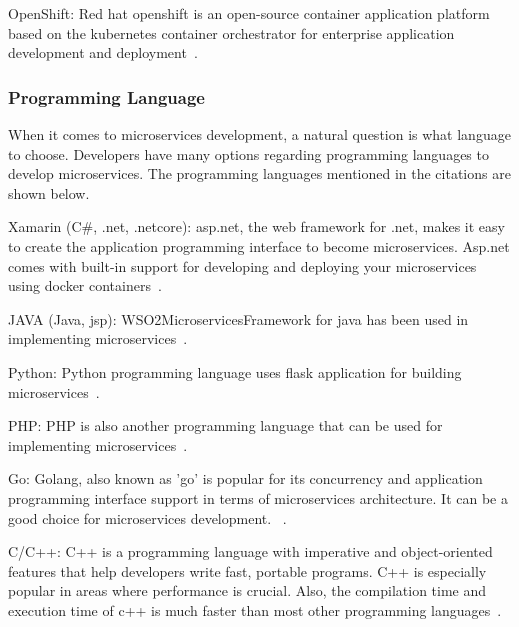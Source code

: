 \par OpenShift: Red hat openshift is an open-source container application platform based on the kubernetes container orchestrator for enterprise application development and deployment~\cite{Johansson2019, Bahadori2018}.


\subsubsection{Programming Language}
When it comes to microservices development, a natural question is what language to choose. Developers have many options regarding programming languages to develop microservices. The programming languages mentioned in the citations are shown below.

\par Xamarin (C\#, .net, .netcore): asp.net, the web framework for .net, makes it easy to create the application programming interface to become microservices. Asp.net comes with built-in support for developing and deploying your microservices using docker containers~\cite{liu2018, chauvel2018, haugeland2020, Johansson2019, neves2019, Falatiuk2019}.

\par JAVA (Java, jsp): WSO2MicroservicesFramework for java has been used in implementing microservices~\cite{Sharaf2019, khan2020, KalskeM2017, Venugopal2017}.

\par Python: Python programming language uses flask application for building microservices~\cite{Ghebremicael2017, khan2020, Hou2020}.

\par PHP: PHP is also another programming language that can be used for implementing microservices~\cite{McElhiney2018}.

\par Go: Golang, also known as 'go' is popular for its concurrency and application programming interface support in terms of microservices architecture. It can be a good choice for microservices development. ~\cite{liu2018}.

\par C/C++: C++ is a programming language with imperative and object-oriented features that help developers write fast, portable programs. C++ is especially popular in areas where performance is crucial. Also, the compilation time and execution time of c++ is much faster than most other programming languages~\cite{Ghebremicael2017}. 


